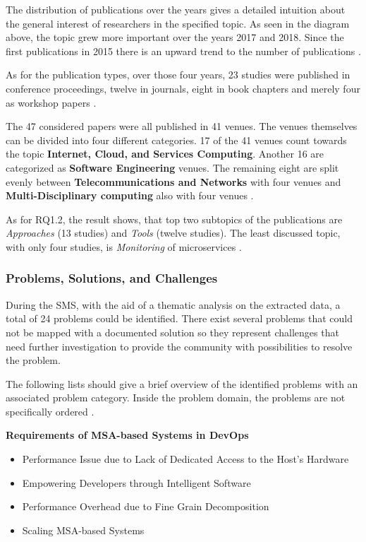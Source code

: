 The distribution of publications over the years gives a detailed intuition
about the general interest of researchers in the specified topic. As seen
in the diagram above, the topic grew more important over the years 2017 and
2018. Since the first publications in 2015 there is an upward trend to
the number of publications \cite{waseem:SMSMSADevOps}.

As for the publication types, over those four years, 23 studies
were published in conference proceedings, twelve in journals, eight in book chapters
and merely four as workshop papers \cite{waseem:SMSMSADevOps}.

The 47 considered papers were all published in 41 venues. The venues
themselves can be divided into four different categories. 17 of the 41
venues count towards the topic \textbf{Internet, Cloud, and Services Computing}.
Another 16 are categorized as \textbf{Software Engineering} venues. The remaining
eight are split evenly between \textbf{Telecommunications and Networks} with four venues
and \textbf{Multi-Disciplinary computing} also with four venues \cite{waseem:SMSMSADevOps}.

As for RQ1.2, the result shows, that top two subtopics of the publications
are \textit{Approaches} (13 studies) and \textit{Tools} (twelve studies).
The least discussed topic, with only four studies, is \textit{Monitoring}
of microservices \cite{waseem:SMSMSADevOps}.

\subsubsection{Problems, Solutions, and Challenges}

During the SMS, with the aid of a thematic analysis on the
extracted data, a total of 24 problems could be identified.
There exist several problems that could not be mapped with a documented
solution so they represent challenges that need further investigation
to provide the community with possibilities to resolve the problem.

The following lists should give a brief overview of the identified
problems with an associated problem category. Inside the problem domain,
the problems are not specifically ordered \cite{waseem:SMSMSADevOps}.

\textbf{Requirements of MSA-based Systems in DevOps}
\begin{itemize}
    \item Performance Issue due to Lack of Dedicated Access
          to the Host's Hardware
    \item Empowering Developers through Intelligent Software
    \item Performance Overhead due to Fine Grain Decomposition
    \item Scaling MSA-based Systems
\end{itemize}

